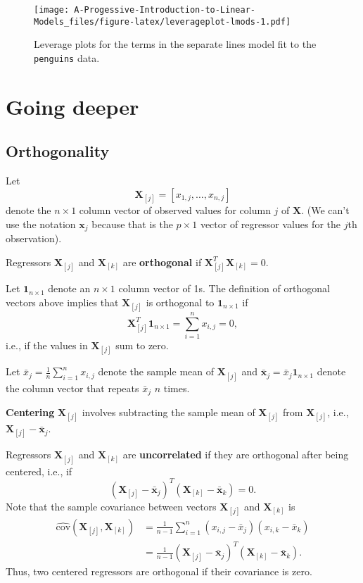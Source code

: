 \documentclass[
]{book}
\theoremstyle{definition}
\theoremstyle{definition}
\theoremstyle{definition}
\theoremstyle{definition}
\theoremstyle{remark}
\begin{document}
\begin{figure}
\centering
\texttt{[image: A-Progessive-Introduction-to-Linear-Models\_files/figure-latex/leverageplot-lmods-1.pdf]}
\caption{\label{fig:leverageplot-lmods}Leverage plots for the terms in the separate lines model fit to the \texttt{penguins} data.}
\end{figure}

\hypertarget{going-deeper-1}{%
\section{Going deeper}\label{going-deeper-1}}

\hypertarget{orthogonality}{%
\subsection{Orthogonality}\label{orthogonality}}

Let \[\mathbf{X}_{[j]}=[x_{1,j},\ldots,x_{n,j}]\] denote the \(n\times 1\)
column vector of observed values for column \(j\) of \(\mathbf{X}\). (We can't use the
notation \(\mathbf{x}_j\) because that is the \(p\times 1\) vector of
regressor values for the \(j\)th observation).

Regressors
\(\mathbf{X}_{[j]}\) and \(\mathbf{X}_{[k]}\) are \textbf{orthogonal} if
\(\mathbf{X}_{[j]}^T \mathbf{X}_{[k]}=0\).

Let \(\boldsymbol{1}_{n\times1}\) denote an \(n\times 1\) column vector of
1s. The definition of orthogonal vectors above implies that
\(\mathbf{X}_{[j]}\) is orthogonal to \(\boldsymbol{1}_{n\times1}\) if \[
\mathbf{X}_{[j]}^T \boldsymbol{1}_{n\times1} = \sum_{i=1}^n x_{i,j} = 0,\]
i.e., if the values in \(\mathbf{X}_{[j]}\) sum to zero.

Let \(\bar{x}_j = \frac{1}{n}\sum_{i=1}^n x_{i,j}\) denote the sample mean
of \(\mathbf{X}_{[j]}\) and
\(\bar{\mathbf{x}}_j = \bar{x}_j \boldsymbol{1}_{n\times 1}\) denote the
column vector that repeats \(\bar{x}_j\) \(n\) times.

\textbf{Centering} \(\mathbf{X}_{[j]}\) involves subtracting the sample mean of
\(\mathbf{X}_{[j]}\) from \(\mathbf{X}_{[j]}\), i.e.,
\(\mathbf{X}_{[j]} - \bar{\mathbf{x}}_j\).

Regressors \(\mathbf{X}_{[j]}\) and \(\mathbf{X}_{[k]}\) are
\textbf{uncorrelated} if they are orthogonal after being centered, i.e., if
\[
(\mathbf{X}_{[j]} - \bar{\mathbf{x}}_j)^T (\mathbf{X}_{[k]} - \bar{\mathbf{x}}_k)=0.
\] Note that the sample covariance between vectors \(\mathbf{X}_{[j]}\)
and \(\mathbf{X}_{[k]}\) is \[
\begin{aligned}
\widehat{\mathrm{cov}}(\mathbf{X}_{[j]}, \mathbf{X}_{[k]}) &= \frac{1}{n-1}\sum_{i=1}^n (x_{i,j} - \bar{x}_j)(x_{i,k} - \bar{x}_k) \\
 &= \frac{1}{n-1}(\mathbf{X}_{[j]} - \bar{\mathbf{x}}_j)^T (\mathbf{X}_{[k]} - \bar{\mathbf{x}}_k).
\end{aligned}
\]Thus, two centered regressors are orthogonal if their covariance is
zero.
\end{document}
